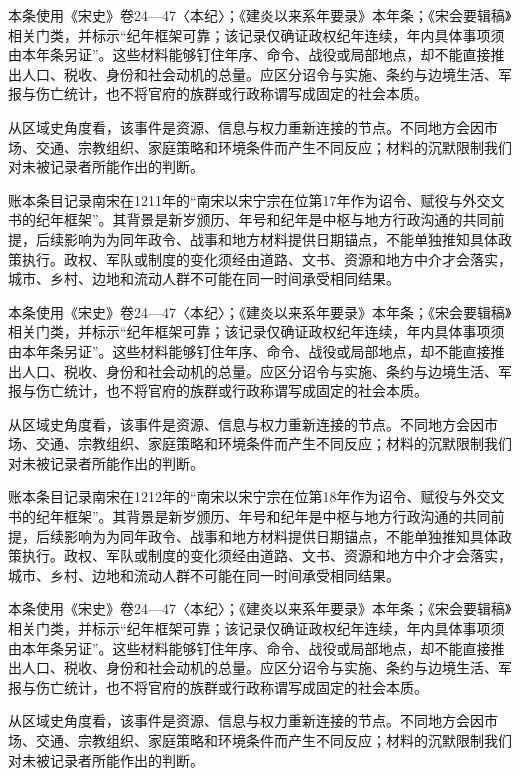 本条使用《宋史》卷24—47〈本纪〉；《建炎以来系年要录》本年条；《宋会要辑稿》相关门类，并标示“纪年框架可靠；该记录仅确证政权纪年连续，年内具体事项须由本年条另证”。这些材料能够钉住年序、命令、战役或局部地点，却不能直接推出人口、税收、身份和社会动机的总量。应区分诏令与实施、条约与边境生活、军报与伤亡统计，也不将官府的族群或行政称谓写成固定的社会本质。

从区域史角度看，该事件是资源、信息与权力重新连接的节点。不同地方会因市场、交通、宗教组织、家庭策略和环境条件而产生不同反应；材料的沉默限制我们对未被记录者所能作出的判断。

账本条目记录南宋在1211年的“南宋以宋宁宗在位第17年作为诏令、赋役与外交文书的纪年框架”。其背景是新岁颁历、年号和纪年是中枢与地方行政沟通的共同前提，后续影响为为同年政令、战事和地方材料提供日期锚点，不能单独推知具体政策执行。政权、军队或制度的变化须经由道路、文书、资源和地方中介才会落实，城市、乡村、边地和流动人群不可能在同一时间承受相同结果。

本条使用《宋史》卷24—47〈本纪〉；《建炎以来系年要录》本年条；《宋会要辑稿》相关门类，并标示“纪年框架可靠；该记录仅确证政权纪年连续，年内具体事项须由本年条另证”。这些材料能够钉住年序、命令、战役或局部地点，却不能直接推出人口、税收、身份和社会动机的总量。应区分诏令与实施、条约与边境生活、军报与伤亡统计，也不将官府的族群或行政称谓写成固定的社会本质。

从区域史角度看，该事件是资源、信息与权力重新连接的节点。不同地方会因市场、交通、宗教组织、家庭策略和环境条件而产生不同反应；材料的沉默限制我们对未被记录者所能作出的判断。

账本条目记录南宋在1212年的“南宋以宋宁宗在位第18年作为诏令、赋役与外交文书的纪年框架”。其背景是新岁颁历、年号和纪年是中枢与地方行政沟通的共同前提，后续影响为为同年政令、战事和地方材料提供日期锚点，不能单独推知具体政策执行。政权、军队或制度的变化须经由道路、文书、资源和地方中介才会落实，城市、乡村、边地和流动人群不可能在同一时间承受相同结果。

本条使用《宋史》卷24—47〈本纪〉；《建炎以来系年要录》本年条；《宋会要辑稿》相关门类，并标示“纪年框架可靠；该记录仅确证政权纪年连续，年内具体事项须由本年条另证”。这些材料能够钉住年序、命令、战役或局部地点，却不能直接推出人口、税收、身份和社会动机的总量。应区分诏令与实施、条约与边境生活、军报与伤亡统计，也不将官府的族群或行政称谓写成固定的社会本质。

从区域史角度看，该事件是资源、信息与权力重新连接的节点。不同地方会因市场、交通、宗教组织、家庭策略和环境条件而产生不同反应；材料的沉默限制我们对未被记录者所能作出的判断。

